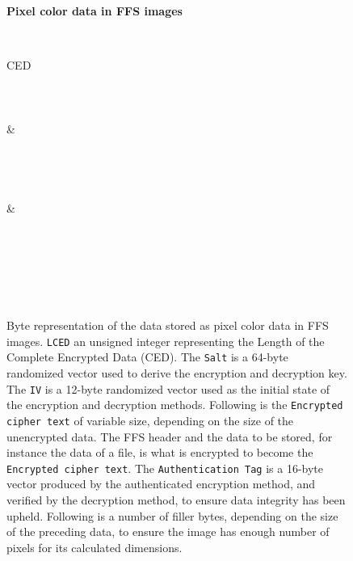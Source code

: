 \begin{figure}[!htb]
	\label{fig:app_bin_pixels}
	\centering
    \textbf{Pixel color data in FFS images}\par\medskip

	\begin{bytefield}[bitwidth=0.0312\textwidth]{32}
		 \\
		\begin{rightwordgroup}{CED}\\
			 \\
			 \\
			 \\
			 & \\
			 \\
			 \\
			\skippedwords \\
			 \\
			 & 
		\end{rightwordgroup} \\
		 \\
		 \\
		\skippedwords \\
		 \\
	\end{bytefield}
	\caption[Byte representation of the data stored as pixel color data in FFS images]{Byte representation of the data stored as pixel color data in FFS images. \texttt{LCED} an unsigned integer representing the Length of the Complete Encrypted Data (\gls{CED}). The \texttt{Salt} is a 64-byte randomized vector used to derive the encryption and decryption key. The \texttt{IV} is a 12-byte randomized vector used as the initial state of the encryption and decryption methods. Following is the \texttt{Encrypted cipher text} of variable size, depending on the size of the unencrypted data. The FFS header and the data to be stored, for instance the data of a file, is what is encrypted to become the \texttt{Encrypted cipher text}. The \texttt{Authentication Tag} is a 16-byte vector produced by the authenticated encryption method, and verified by the decryption method, to ensure data integrity has been upheld. Following is a number of filler bytes, depending on the size of the preceding data, to ensure the image has enough number of pixels for its calculated dimensions.}
\end{figure}